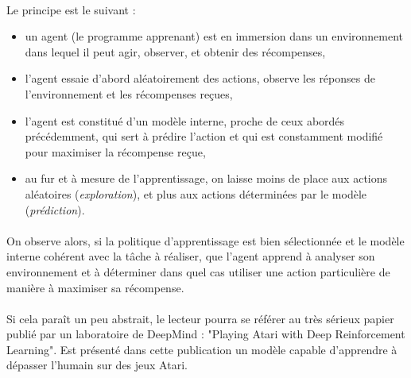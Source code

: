 \documentclass[a4paper,10pt]{article}
\begin{document}
                \paragraph{}
                    Le principe est le suivant : 
                        \begin{itemize}
                            \item un agent (le programme apprenant) est en immersion dans 
                            un environnement dans lequel il peut agir, observer, et obtenir 
                            des récompenses,
                            \item l'agent essaie d'abord aléatoirement des actions, observe 
                            les réponses de l'environnement et les récompenses reçues,
                            \item l'agent est constitué d'un modèle interne, proche de ceux 
                            abordés précédemment, qui sert à prédire l'action et qui est constamment modifié pour maximiser 
                            la récompense reçue, 
                            \item au fur et à mesure de l'apprentissage, on laisse moins de place
                            aux actions aléatoires (\textit{exploration}), et plus aux actions
                            déterminées par le modèle (\textit{prédiction}). 
                        \end{itemize}
                        
                \paragraph{}
                    On observe alors, si la politique d'apprentissage est bien sélectionnée
                    et le modèle interne cohérent avec la tâche à réaliser, que l'agent apprend 
                    à analyser son environnement et à déterminer dans quel cas utiliser une action
                    particulière de manière à maximiser sa récompense. 
                    
                \paragraph{}
                    Si cela paraît un peu abstrait, le lecteur pourra se référer au très sérieux papier 
                    publié par un laboratoire de DeepMind : "Playing Atari with Deep Reinforcement Learning". 
                    Est présenté dans cette publication un modèle capable d'apprendre à dépasser l'humain 
                    sur des jeux Atari. 
                    
\end{document}

